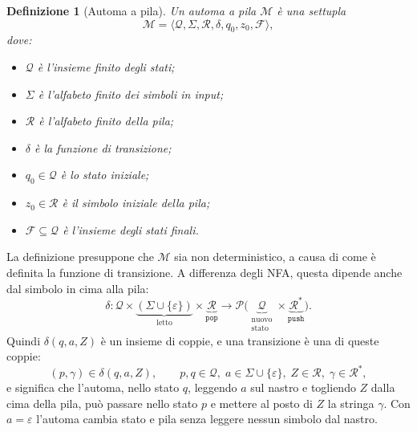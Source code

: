 \documentclass[a4paper, 11pt, oneside]{book}
\theoremstyle{formale}
\newtheorem*{definition}{Definizione}
\begin{document}
    \begin{definition}[Automa a pila]
        Un \emph{automa a pila} $\mathcal{M}$ \`e una settupla
        \begin{equation*}
            \mathcal{M} = \langle \mathcal{Q}, \Sigma, \mathcal{R}, \delta, q_0, z_0,
            \mathcal{F} \rangle,
        \end{equation*}
        dove:
        \begin{itemize}
            \item $\mathcal{Q}$ \`e l'insieme finito degli stati;
            \item $\Sigma$ \`e l'alfabeto finito dei simboli in input;
            \item $\mathcal{R}$ \`e l'alfabeto finito della pila;
            \item $\delta$ \`e la funzione di transizione;
            \item $q_0 \in \mathcal{Q}$ \`e lo stato iniziale;
            \item $z_0 \in \mathcal{R}$ \`e il simbolo iniziale della pila;
            \item $\mathcal{F} \subseteq \mathcal{Q}$ \`e l'insieme degli stati finali.
        \end{itemize}
    \end{definition}
    La definizione presuppone che $\mathcal{M}$ sia non deterministico, a causa di come
    \`e definita la funzione di transizione. A differenza degli NFA, questa dipende anche
    dal simbolo in cima alla pila:
    \begin{equation*}
        \delta \colon \mathcal{Q} \times
        \underbrace{(\Sigma \cup \{\varepsilon\})}_{\text{letto}} \times
        \underbrace{\mathcal{R}}_{\texttt{pop}}
        \to \mathcal{P}\bigl(
        \underbrace{\mathcal{Q}}_{\substack{\text{nuovo}\\ \text{stato}}} \times
        \underbrace{\mathcal{R}^*}_{\texttt{push}}
        \bigr).
    \end{equation*}
    Quindi $\delta(q, a, Z)$ \`e un insieme di coppie, e una transizione \`e una di
    queste coppie:
    \begin{equation*}
        (p, \gamma) \in \delta(q, a, Z),
        \qquad p, q \in \mathcal{Q},\; a \in \Sigma \cup \{\varepsilon\},\;
        Z \in \mathcal{R},\; \gamma \in \mathcal{R}^*,
    \end{equation*}
    e significa che l'automa, nello stato $q$, leggendo $a$ sul nastro e togliendo $Z$
    dalla cima della pila, pu\`o passare nello stato $p$ e mettere al posto di $Z$ la
    stringa $\gamma$. Con $a = \varepsilon$ l'automa cambia stato e pila senza leggere
    nessun simbolo dal nastro.
\end{document}
